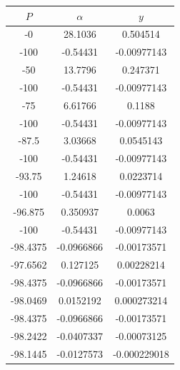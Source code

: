 \documentclass[a4paper,14pt]{extarticle}
\begin{document}
\begin{enumerate}[1. ]
          \begin{center}
              \begin{longtable}{|c|c|c|}
                  \hline
                  $P$      & $\alpha$     & $y$          \\
                  \hline
                  -0       & 28.1036      & 0.504514     \\
                  \hline
                  -100     & -0.54431     & -0.00977143  \\
                  \hline
                  -50      & 13.7796      & 0.247371     \\
                  \hline
                  -100     & -0.54431     & -0.00977143  \\
                  \hline
                  -75      & 6.61766      & 0.1188       \\
                  \hline
                  -100     & -0.54431     & -0.00977143  \\
                  \hline
                  -87.5    & 3.03668      & 0.0545143    \\
                  \hline
                  -100     & -0.54431     & -0.00977143  \\
                  \hline
                  -93.75   & 1.24618      & 0.0223714    \\
                  \hline
                  -100     & -0.54431     & -0.00977143  \\
                  \hline
                  -96.875  & 0.350937     & 0.0063       \\
                  \hline
                  -100     & -0.54431     & -0.00977143  \\
                  \hline
                  -98.4375 & -0.0966866   & -0.00173571  \\
                  \hline
                  -97.6562 & 0.127125     & 0.00228214   \\
                  \hline
                  -98.4375 & -0.0966866   & -0.00173571  \\
                  \hline
                  -98.0469 & 0.0152192    & 0.000273214  \\
                  \hline
                  -98.4375 & -0.0966866   & -0.00173571  \\
                  \hline
                  -98.2422 & -0.0407337   & -0.00073125  \\
                  \hline
                  -98.1445 & -0.0127573   & -0.000229018 \\

\end{longtable}
\end{center}
\end{enumerate}
\end{document}
